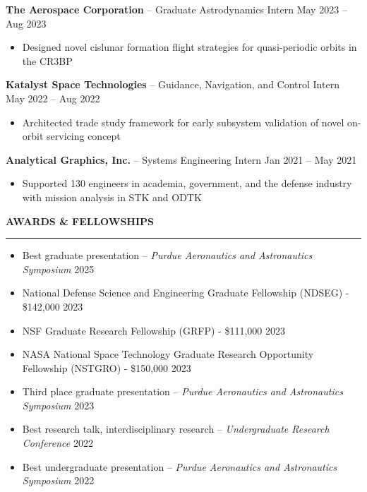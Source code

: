 \documentclass[10pt, a4paper]{article}
\newcommand{\sectiontitle}[1]{{\Large \textbf{#1}}\vspace{0.5em}\hrule\vspace{0.5em}}
\begin{document}
\textbf{The Aerospace Corporation} -- Graduate Astrodynamics Intern \hfill May 2023 -- Aug 2023
\begin{itemize}[noitemsep]
    \item Designed novel cislunar formation flight strategies for quasi-periodic orbits in the CR3BP
\end{itemize}

\textbf{Katalyst Space Technologies} -- Guidance, Navigation, and Control Intern \hfill May 2022 -- Aug 2022
\begin{itemize}[noitemsep]
    \item Architected trade study framework for early subsystem validation of novel on-orbit servicing concept
\end{itemize}

\textbf{Analytical Graphics, Inc.} -- Systems Engineering Intern \hfill Jan 2021 -- May 2021
\begin{itemize}[noitemsep]
    \item Supported 130 engineers in academia, government, and the defense industry with mission analysis in STK and ODTK
\end{itemize}
\vspace{7px}

\sectiontitle{AWARDS \& FELLOWSHIPS}
\begin{itemize}[noitemsep]
    \item Best graduate presentation -- \textit{Purdue Aeronautics and Astronautics Symposium} \hfill 2025
    \item National Defense Science and Engineering Graduate Fellowship (NDSEG) - \$142,000 \hfill 2023
    \item NSF Graduate Research Fellowship (GRFP) - \$111,000 \hfill 2023
    \item NASA National Space Technology Graduate Research Opportunity Fellowship (NSTGRO) - \$150,000 \hfill 2023
    \item Third place graduate presentation -- \textit{Purdue Aeronautics and Astronautics Symposium} \hfill 2023
    \item Best research talk, interdisciplinary research -- \textit{Undergraduate Research Conference} \hfill 2022
    \item Best undergraduate presentation -- \textit{Purdue Aeronautics and Astronautics Symposium} \hfill 2022
\end{itemize}
\end{document}
